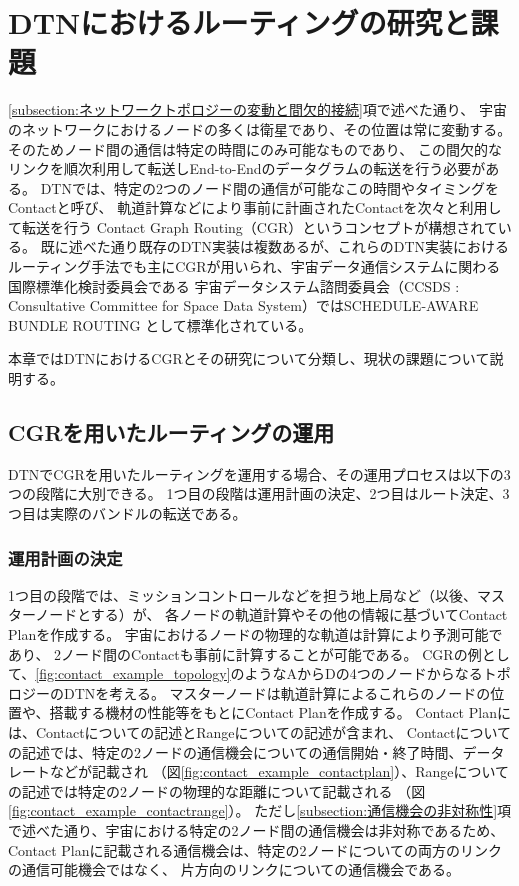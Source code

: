 \chapter{DTNにおけるルーティングの研究と課題}
\label{chap:DTNにおけるルーティングの研究と課題}

\ref{subsection:ネットワークトポロジーの変動と間欠的接続}項で述べた通り、
宇宙のネットワークにおけるノードの多くは衛星であり、その位置は常に変動する。
そのためノード間の通信は特定の時間にのみ可能なものであり、
この間欠的なリンクを順次利用して転送しEnd-to-Endのデータグラムの転送を行う必要がある。
DTNでは、特定の2つのノード間の通信が可能なこの時間やタイミングをContactと呼び、
軌道計算などにより事前に計画されたContactを次々と利用して転送を行う
Contact Graph Routing（CGR）\cite{Fraire2021}というコンセプトが構想されている。
既に述べた通り既存のDTN実装は複数あるが、これらのDTN実装における
ルーティング手法でも主にCGRが用いられ、宇宙データ通信システムに関わる国際標準化検討委員会である
宇宙データシステム諮問委員会（CCSDS : Consultative Committee 
for Space Data System）ではSCHEDULE-AWARE BUNDLE ROUTING
\cite{schedule_aware_bundle_routing}として標準化されている。

本章ではDTNにおけるCGRとその研究について分類し、現状の課題について説明する。

\section{CGRを用いたルーティングの運用}
DTNでCGRを用いたルーティングを運用する場合、その運用プロセスは以下の3つの段階に大別できる。
1つ目の段階は運用計画の決定、2つ目はルート決定、3つ目は実際のバンドルの転送である。

\subsection{運用計画の決定}
\label{subsection:運用計画の決定}
1つ目の段階では、ミッションコントロールなどを担う地上局など（以後、マスターノードとする）が、
各ノードの軌道計算やその他の情報に基づいてContact Planを作成する。
宇宙におけるノードの物理的な軌道は計算により予測可能であり、
2ノード間のContactも事前に計算することが可能である。 
CGRの例として、\ref{fig:contact_example_topology}のようなAからDの4つのノードからなるトポロジーのDTNを考える。
マスターノードは軌道計算によるこれらのノードの位置や、搭載する機材の性能等をもとにContact Planを作成する。
Contact Planには、Contactについての記述とRangeについての記述が含まれ、
Contactについての記述では、特定の2ノードの通信機会についての通信開始・終了時間、データレートなどが記載され
（図\ref{fig:contact_example_contactplan}）、Rangeについての記述では特定の2ノードの物理的な距離について記載される
（図\ref{fig:contact_example_contactrange}）。
ただし\ref{subsection:通信機会の非対称性}項で述べた通り、宇宙における特定の2ノード間の通信機会は非対称であるため、
Contact Planに記載される通信機会は、特定の2ノードについての両方のリンクの通信可能機会ではなく、
片方向のリンクについての通信機会である。


